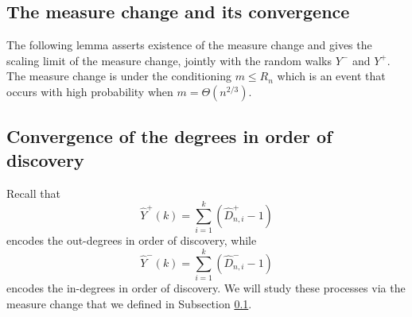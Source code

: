 \subsection{The measure change and its convergence}\label{subsec.measurechange}

The following lemma asserts existence of the measure change and gives the scaling limit of the measure change, jointly with the random walks $Y^-$ and $Y^+$. The measure change is under the conditioning $m \leq R_n$ which is an event that occurs with high probability when $m = \Theta(n^{2/3})$.



\subsection{Convergence of the degrees in order of discovery}
Recall that
$$ \hat{Y}^+(k)=\sum\limits_{i=1}^k (\hat{D}^+_{n,i}-1)$$
encodes the out-degrees in order of discovery, while 
$$ \hat{Y}^-(k)=\sum\limits_{i=1}^k (\hat{D}^-_{n,i}-1)$$
encodes the in-degrees in order of discovery.
 We will study these processes via the measure change that we defined in Subsection \ref{subsec.measurechange}. 
 


